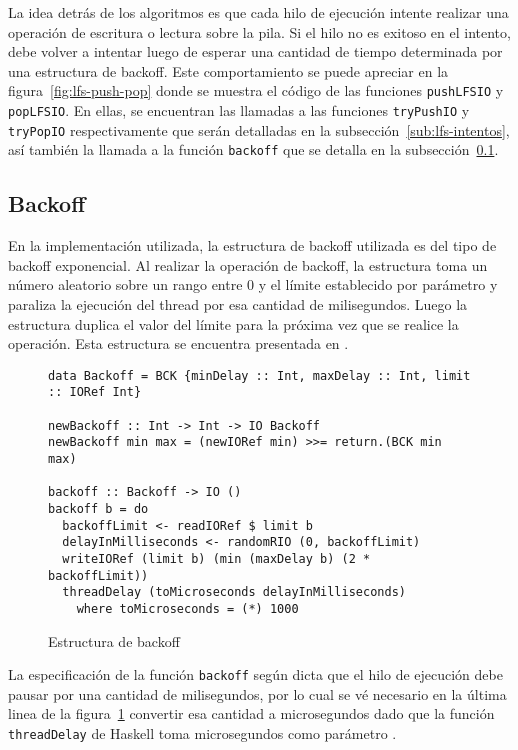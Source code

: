 La idea detrás de los algoritmos es que cada hilo de ejecución intente realizar una operación de escritura o lectura sobre la pila. Si el hilo no es exitoso en el intento, debe volver a intentar luego de esperar una cantidad de tiempo determinada por una estructura de backoff. Este comportamiento se puede apreciar en la figura~\ref{fig:lfs-push-pop} donde se muestra el código de las funciones \texttt{pushLFSIO} y \texttt{popLFSIO}. En ellas, se encuentran las llamadas a las funciones \texttt{tryPushIO} y \texttt{tryPopIO} respectivamente que serán detalladas en la subsección~\ref{sub:lfs-intentos}, así también la llamada a la función \texttt{backoff} que se detalla en la subsección~\ref{sub:backoff}.

\subsection{Backoff}\label{sub:backoff}
En la implementación utilizada, la estructura de backoff utilizada es del tipo de backoff exponencial. Al realizar la operación de backoff, la estructura toma un número aleatorio sobre un rango entre 0 y el límite establecido por parámetro y paraliza la ejecución del thread por esa cantidad de milisegundos. Luego la estructura duplica el valor del límite para la próxima vez que se realice la operación. Esta estructura se encuentra presentada en \cite{shavit}.

\begin{figure}[H]
  \begin{verbatim}
data Backoff = BCK {minDelay :: Int, maxDelay :: Int, limit :: IORef Int}

newBackoff :: Int -> Int -> IO Backoff
newBackoff min max = (newIORef min) >>= return.(BCK min max)

backoff :: Backoff -> IO ()
backoff b = do
  backoffLimit <- readIORef $ limit b
  delayInMilliseconds <- randomRIO (0, backoffLimit)
  writeIORef (limit b) (min (maxDelay b) (2 * backoffLimit))
  threadDelay (toMicroseconds delayInMilliseconds)
    where toMicroseconds = (*) 1000
  \end{verbatim}
  \caption{Estructura de backoff}
  \label{fig:backoff-code}
\end{figure}

La especificación de la función \texttt{backoff} según \cite{shavit} dicta que el hilo de ejecución debe pausar por una cantidad de milisegundos, por lo cual se vé necesario en la última linea de la figura~\ref{fig:backoff-code} convertir esa cantidad a microsegundos dado que la función \texttt{threadDelay} de Haskell toma microsegundos como parámetro \cite{threadDelay}.

